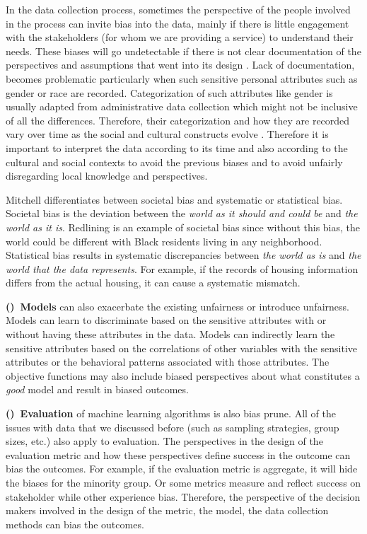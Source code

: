         In the data collection process, sometimes the perspective of the people involved in the process can invite bias into the data, mainly if there is little engagement with the stakeholders (for whom we are providing a service) to understand their needs. These biases will go undetectable if there is not clear documentation of the perspectives and assumptions that went into its design \cite{Hutchinson2021Account}. Lack of documentation, becomes problematic particularly when such sensitive personal attributes such as gender or race are recorded. Categorization of such attributes like gender is usually adapted from administrative data collection which might not be inclusive of all the differences. Therefore, their categorization and how they are recorded vary over time as the social and cultural constructs evolve \cite{Hanna2020CriticalRace}. Therefore it is important to interpret the data according to its time and also according to the cultural and social contexts to avoid the previous biases and to avoid unfairly disregarding local knowledge and perspectives.
        
        Mitchell \cite{mitchell2021algorithmic} differentiates between societal bias and systematic or statistical bias. Societal bias is the deviation between the \textit{world as it should and could be} and \textit{the world as it is}. Redlining is an example of societal bias since without this bias, the world could be different with Black residents living in any neighborhood. Statistical bias results in systematic discrepancies between \textit{the world as is} and \textit{the world that the data represents}. For example, if the records of housing information differs from the actual housing, it can cause a systematic mismatch.
        
        \textbf{()~Models} can also exacerbate the existing unfairness or introduce unfairness. Models can learn to discriminate based on the sensitive attributes with or without having these attributes in the data. Models can indirectly learn the sensitive attributes based on the correlations of other variables with the sensitive attributes or the behavioral patterns associated with those attributes. The objective functions may also include biased perspectives about what constitutes a \textit{good} model and result in biased outcomes.
        
        \textbf{()~Evaluation} of machine learning algorithms is also bias prune. All of the issues with data that we discussed before (such as sampling strategies, group sizes, etc.) also apply to evaluation. The perspectives in the design of the evaluation metric and how these perspectives define success in the outcome can bias the outcomes. For example, if the evaluation metric is aggregate, it will hide the biases for the minority group. Or some metrics measure and reflect success on stakeholder while other experience bias. Therefore, the perspective of the decision makers involved in the design of the metric, the model, the data collection methods can bias the outcomes.
        
